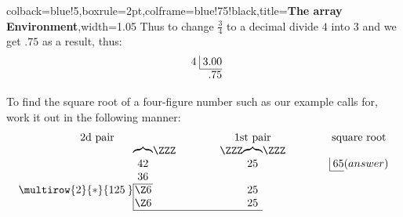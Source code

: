\begin{tcblisting}{colback=blue!5,boxrule=2pt,colframe=blue!75!black,title=\textbf{The array Environment},width=1.05\textwidth}
Thus to change $\frac34$ to a decimal divide $4$ into $3$
and we get $.75$ as a result, thus:
\[
\begin{array}{r@{}r@{}}
4 \; & \vline \; 3.00 \\\cline{2-2}
     &            .75
\end{array}
\]

To find the square root of a four-figure number
such as our example calls for, work it out in the
following manner:
\[
\arraycolsep=0em
\begin{array}{cccccccccccc}
\multicolumn{3}{c}{\text{2d pair}} &\qquad&\qquad&
\multicolumn{3}{c}{\text{1st pair}}&\qquad&\qquad&
\multicolumn{2}{c}{\text{square root}}\\
 & \overbrace{\quad}&\ZZZ&&&\ZZZ&\overbrace{\quad}&\ZZZ\\
 & 42 &&&&& 25 &&&&\vline\;65&(answer)\\\cline{11-11}
 & 36 &&&&& \\\cline{2-2}
\multirow{2}{*}{125\:} & \vline\hfill \Z6 \hfill&&&&& 25\\
 & \vline\hfill \Z6 \hfill&&&&& 25\\\cline{2-7}
\end{array}
\]

\end{tcblisting}

